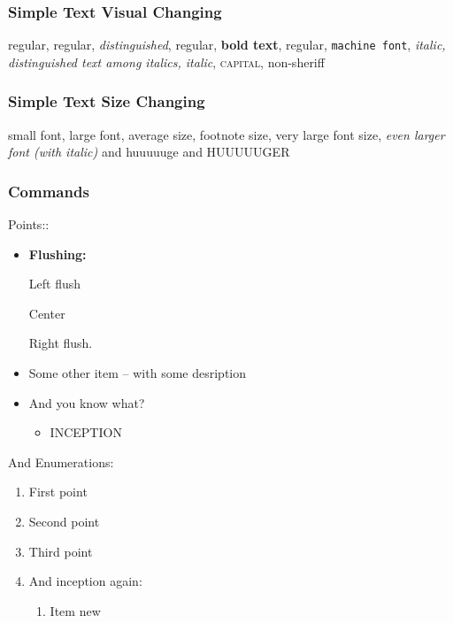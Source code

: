 \subsubsection{Simple Text Visual Changing} %

regular, regular, \emph{distinguished}, regular, \textbf{bold text}, regular, \texttt{machine font}, \textit{ italic, {\em distinguished text among italics}, italic}, \textsc{capital}, \textsf{non-sheriff}


\subsubsection{Simple Text Size Changing}

{\small small font}, {\large large font}, average size, {\footnotesize footnote size}, {\Large very large font size},
\textit{\LARGE even larger font (with italic)} {\huge and huuuuuge} {\Huge and HUUUUUGER}

\subsubsection{Commands}


Points:: %
\begin{itemize}
    \item \textbf{Flushing:}
        \begin{flushleft}
        Left flush
        \end{flushleft}
        \begin{center}
        Center
        \end{center}
        \begin{flushright}
        Right flush.
        \end{flushright}
    \item Some other item -- with some desription
    \item And you know what?
        \begin{itemize} %
        \item INCEPTION
        \end{itemize}
\end{itemize}

And Enumerations: %
\begin{enumerate}
    \item First point
    \item Second point
    \item Third point
    \item And inception again:
    \begin{enumerate}
        \item Item new
    \end{enumerate}
\end{enumerate}